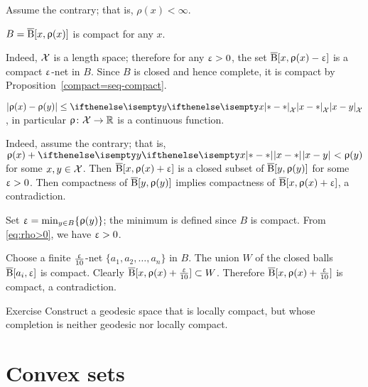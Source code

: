 Assume the contrary; that is, $\rho(x)<\infty$.

\begin{clm}{} $B=\overline{\mathrm{B}}{}[x,\upvarrho(x)]$ is compact for any $x$.
\end{clm}

Indeed, $\mathcal{X}$ is a length space;
therefore for any $\upvarepsilon>0$, 
the set $\overline{\mathrm{B}}{}[x,\upvarrho(x)-\upvarepsilon]$ is a compact $\upvarepsilon$-net in $B$.
Since $B$ is closed and hence complete, it is compact by Proposition~\ref{compact=seq-compact}.
\claimqeds

\begin{clm}{} $|\rho(x)-\rho(y)|\le \dist{x}{y}{\spc{X}}$,
in particular $\rho\:\spc{X}\to\RR$ is a continuous function.
\end{clm}

Indeed, assume the contrary; that is, $\rho(x)+\dist{x}{y}{}<\rho(y)$ for some $x,y\in \spc{X}$. 
Then 
$\overline{\mathrm{B}}{}[x,\upvarrho(x)+\upvarepsilon]$ is a closed subset of $\overline{\mathrm{B}}{}[y,\upvarrho(y)]$ for some $\upvarepsilon>0$.
Then  compactness of $\overline{\mathrm{B}}{}[y,\upvarrho(y)]$ implies compactness of $\overline{\mathrm{B}}{}[x,\upvarrho(x)+\upvarepsilon]$, a contradiction.\claimqeds

Set $\eps=\min_{y\in B}\{\rho(y)\}$; 
the minimum is defined since $B$ is compact.
From \ref{eq:rho>0}, we have $\upvarepsilon>0$.

Choose a finite $\tfrac{\upvarepsilon}{10}$-net $\{a_1,a_2,\dots,a_n\}$ in $B$.
The union $W$ of the closed balls $\overline{\mathrm{B}}{}[a_i,\upvarepsilon]$ is compact.
Clearly 
$\cBall[x,\rho(x)+\frac\eps{10}]\subset W$.
Therefore $\overline{\mathrm{B}}{}[x,\upvarrho(x)+\frac{\upvarepsilon}{10}]$ is compact,
a contradiction.
\qeds

\begin{thm}{Exercise}\label{exercise from BH}
Construct a geodesic space that is locally compact,
but whose completion is neither geodesic nor locally compact.
\end{thm}

\section{Convex sets}


